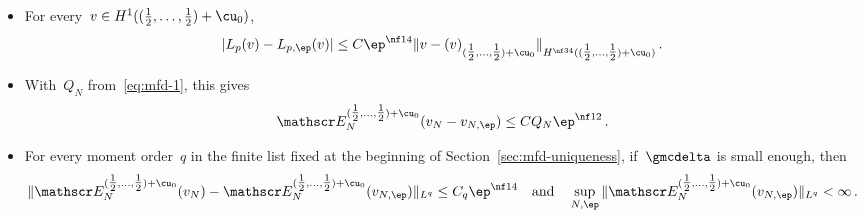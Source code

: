 \documentclass[11pt]{amsart}
\begin{document}
\begin{lemma}
\label{mfd:lem-neumann-error}
\begin{itemize}
\item For every~$v\in H^1((\tfrac12,\dots,\tfrac12)+\cu_0)$,
\begin{equation}
	|L_p(v)-L_{p,\ep}(v)|
	\leq C\ep^{\nf14}\|v-(v)_{(\tfrac12,\dots,\tfrac12)+\cu_0}\|_{H^{\nf34}((\tfrac12,\dots,\tfrac12)+\cu_0)}\,.
	\label{eq:mfd-7}
\end{equation}
\item With~$Q_N$ from~\eqref{eq:mfd-1}, this gives
\begin{equation}
	\mathscr E_N^{(\tfrac12,\dots,\tfrac12)+\cu_0}(v_N-v_{N,\ep})\leq CQ_N\ep^{\nf12}\,.
	\label{eq:mfd-8}
\end{equation}
\item For every moment order~$q$ in the finite list fixed at the beginning of Section~\ref{sec:mfd-uniqueness}, if~$\gmcdelta$ is small enough, then
\begin{equation}
	\|\mathscr E_N^{(\tfrac12,\dots,\tfrac12)+\cu_0}(v_N)-\mathscr E_N^{(\tfrac12,\dots,\tfrac12)+\cu_0}(v_{N,\ep})\|_{L^q}\leq C_q\ep^{\nf14}
	\quad\text{and}\quad \sup_{N,\ep}\|\mathscr E_N^{(\tfrac12,\dots,\tfrac12)+\cu_0}(v_{N,\ep})\|_{L^q}<\infty\,.
	\label{eq:mfd-9}
\end{equation}
\end{itemize}
\end{lemma}
\end{document}
